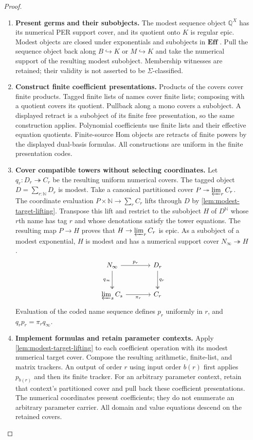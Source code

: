 \documentclass[11pt,a4paper]{article}
\numberwithin{algorithm}{section}
\numberwithin{equation}{section}
\theoremstyle{definition}
\theoremstyle{remark}
\theoremstyle{plain}
\newcommand{\N}{\mathbb N}
\newcommand{\QQ}{\mathbb Q}
\newcommand{\Eff}{\mathbf{Eff}}
\newcommand{\incl}{\hookrightarrow}
\newcommand{\onto}{\twoheadrightarrow}
\theoremstyle{definition}
\theoremstyle{plain}
\begin{document}
\begin{proof}\leavevmode
\begin{enumerate}[leftmargin=*,align=left]
\item \textbf{Present germs and their subobjects.}
The modest sequence object $\QQ^X$ has its numerical PER support
cover, and its quotient onto $K$ is regular epic. Modest objects
are closed under exponentials and subobjects in $\Eff$
\citep{VanOosten2008Realizability}. Pull the sequence object back
along $B\incl K$ or $M\incl K$ and take the numerical support of
the resulting modest subobject. Membership witnesses are
retained; their validity is not asserted to be $\Sigma$-classified.

\item \textbf{Construct finite coefficient presentations.}
Products of the covers cover finite products. Tagged finite lists
of names cover finite lists; composing with a quotient covers
its quotient. Pullback along a mono covers a subobject. A
displayed retract is a subobject of its finite free presentation,
so the same construction applies. Polynomial coefficients use
finite lists and their effective equation quotients. Finite-source
Hom objects are retracts of finite powers by the displayed
dual-basis formulas. All constructions are uniform in the
finite presentation codes.

\item \textbf{Cover compatible towers without selecting coordinates.}
Let $q_r:D_r\onto C_r$ be the resulting uniform numerical covers.
The tagged object $D=\sum_{r:\N}D_r$ is modest. Take a
canonical partitioned cover $P\onto\varprojlim_r C_r$.
The coordinate evaluation
$P\times\N\to\sum_r C_r$ lifts through $D$ by
\cref{lem:modest-target-lifting}. Transpose this lift and restrict
to the subobject $H$ of $D^\N$ whose $r$th name has tag $r$
and whose denotations satisfy the tower equations. The resulting
map $P\to H$ proves that $H\to\varprojlim_r C_r$ is epic.
As a subobject of a modest exponential, $H$ is modest and has
a numerical support cover $N_\infty\onto H$.
\[
\begin{tikzcd}[column sep=large,row sep=large]
N_\infty \arrow[r,"p_r"] \arrow[d,two heads,"q_\infty"'] &
D_r \arrow[d,two heads,"q_r"]\\
\varprojlim_s C_s \arrow[r,"\pi_r"'] & C_r
\end{tikzcd}
\]
Evaluation of the coded name sequence defines $p_r$ uniformly
in $r$, and $q_rp_r=\pi_rq_\infty$.

\item \textbf{Implement formulas and retain parameter contexts.}
Apply \cref{lem:modest-target-lifting} to each coefficient
operation with its modest numerical target cover. Compose the
resulting arithmetic, finite-list, and matrix trackers. An output
of order $r$ using input order $b(r)$ first applies $p_{b(r)}$
and then its finite tracker. For an arbitrary parameter context,
retain that context's partitioned cover and pull back these
coefficient presentations. The numerical coordinates present
coefficients; they do not enumerate an arbitrary parameter carrier.
All domain and value equations descend on the retained covers.
\end{enumerate}
\end{proof}
\end{document}
